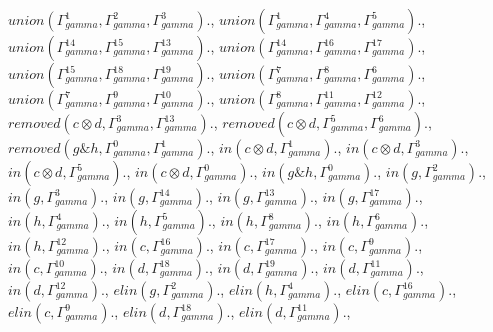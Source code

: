 \documentclass[a4paper, 11pt]{article}
\begin{document}
$union(\Gamma_{gamma}^{1}, \Gamma_{gamma}^{2}, \Gamma_{gamma}^{3}).$, $union(\Gamma_{gamma}^{1}, \Gamma_{gamma}^{4}, \Gamma_{gamma}^{5}).$, $union(\Gamma_{gamma}^{14}, \Gamma_{gamma}^{15}, \Gamma_{gamma}^{13}).$, $union(\Gamma_{gamma}^{14}, \Gamma_{gamma}^{16}, \Gamma_{gamma}^{17}).$, $union(\Gamma_{gamma}^{15}, \Gamma_{gamma}^{18}, \Gamma_{gamma}^{19}).$, $union(\Gamma_{gamma}^{7}, \Gamma_{gamma}^{8}, \Gamma_{gamma}^{6}).$, $union(\Gamma_{gamma}^{7}, \Gamma_{gamma}^{9}, \Gamma_{gamma}^{10}).$, $union(\Gamma_{gamma}^{8}, \Gamma_{gamma}^{11}, \Gamma_{gamma}^{12}).$, $removed(c \otimes d, \Gamma_{gamma}^{3}, \Gamma_{gamma}^{13}).$, $removed(c \otimes d, \Gamma_{gamma}^{5}, \Gamma_{gamma}^{6}).$, $removed(g \binampersand h, \Gamma_{gamma}^{0}, \Gamma_{gamma}^{1}).$, $in(c \otimes d, \Gamma_{gamma}^{1}).$, $in(c \otimes d, \Gamma_{gamma}^{3}).$, $in(c \otimes d, \Gamma_{gamma}^{5}).$, $in(c \otimes d, \Gamma_{gamma}^{0}).$, $in(g \binampersand h, \Gamma_{gamma}^{0}).$, $in(g, \Gamma_{gamma}^{2}).$, $in(g, \Gamma_{gamma}^{3}).$, $in(g, \Gamma_{gamma}^{14}).$, $in(g, \Gamma_{gamma}^{13}).$, $in(g, \Gamma_{gamma}^{17}).$, $in(h, \Gamma_{gamma}^{4}).$, $in(h, \Gamma_{gamma}^{5}).$, $in(h, \Gamma_{gamma}^{8}).$, $in(h, \Gamma_{gamma}^{6}).$, $in(h, \Gamma_{gamma}^{12}).$, $in(c, \Gamma_{gamma}^{16}).$, $in(c, \Gamma_{gamma}^{17}).$, $in(c, \Gamma_{gamma}^{9}).$, $in(c, \Gamma_{gamma}^{10}).$, $in(d, \Gamma_{gamma}^{18}).$, $in(d, \Gamma_{gamma}^{19}).$, $in(d, \Gamma_{gamma}^{11}).$, $in(d, \Gamma_{gamma}^{12}).$, $elin(g, \Gamma_{gamma}^{2}).$, $elin(h, \Gamma_{gamma}^{4}).$, $elin(c, \Gamma_{gamma}^{16}).$, $elin(c, \Gamma_{gamma}^{9}).$, $elin(d, \Gamma_{gamma}^{18}).$, $elin(d, \Gamma_{gamma}^{11}).$, 
\end{document}
